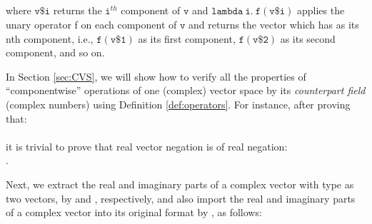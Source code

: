 \documentclass{llncs}
\begin{document}
{\begin{definition}\ \label{def:operators} \vspace{.15cm}\\
 	\vspace{.08cm}	\\
 	\vspace{.08cm}	\\
\\
		\end{definition}
\noindent where  $\mathtt{v\$i}$ returns the $\mathtt i^{th}$ component of $\mathtt v$ and $\mathtt{lambda\ i.\ f(v\$ i)}$ applies the unary operator \hol f on each component of $\mathtt v$ and returns the vector which has  as its nth component, i.e., $\mathtt{f (v\$ 1)}$ as its first component,
$\mathtt{f(v\$ 2)}$ as its second component, and so on. 

In Section \ref{sec:CVS}, we will show how to verify all the properties of ``componentwise'' operations of one (complex) vector space by its \emph{counterpart field} (complex numbers) using Definition \ref{def:operators}. For instance, after proving that: \vspace{.2cm}\\
\noindent  {} \vspace{.25cm}\\
 \noindent it is trivial to prove that real vector negation is  of real negation: \vspace{.2cm}\\
\noindent {}. \vspace{.25cm}

Next, we extract the real and imaginary parts of a complex vector with type  as two  vectors, by  and , respectively, and also import the real and imaginary parts of a complex vector into its original format by , as follows:

\begin{definition} \label{def:mapping} \vspace{.15cm}\\ 
  \vspace{.08cm}\\
  \vspace{.08cm} \\
\\
\end{definition}

}
\end{document}
